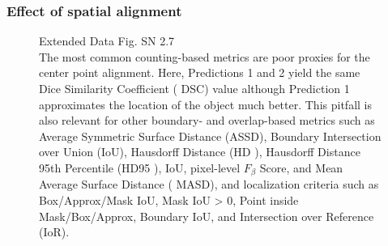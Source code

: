 \documentclass[11pt]{article}
\begin{document}
\begin{figure}[H]
    \centering
    \caption{}
\end{figure}

\subsubsection{Effect of spatial alignment}

\begin{figure}[H]
    \centering
    \caption{Extended Data Fig. SN 2.7~\cite{pitfalls-in-segmentation-evaluation}\\The most common counting-based metrics are poor proxies for the
    center point alignment. Here, Predictions 1 and 2 yield the same Dice Similarity Coefficient ( DSC)
    value although Prediction 1 approximates the location of the object much better. This pitfall is also
    relevant for other boundary- and overlap-based metrics such as Average Symmetric Surface Distance
    (ASSD), Boundary Intersection over Union (IoU), Hausdorff Distance (HD ), Hausdorff Distance
    95th Percentile (HD95 ), IoU, pixel-level $F_\beta$ Score, and Mean Average Surface Distance ( MASD), and
    localization criteria such as Box/Approx/Mask IoU, Mask IoU > 0, Point inside Mask/Box/Approx,
    Boundary IoU, and Intersection over Reference (IoR).}
\end{figure}
\end{document}
